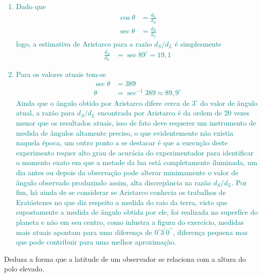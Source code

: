 \begin{sol}
	\textcolor{teal} {
		\begin{enumerate}[label=\alph *)]
			\item Dado que
			\begin{align}
				\cos \theta&=\frac{d_L}{d_S} \nonumber \\
				\sec \theta&=\frac{d_S}{d_L}
			\end{align}
			logo, a estimativa de Aristarco para a razão $d_S/d_L$ é simplesmente
			\begin{align}
				\frac{d_S}{d_L}&=\sec 89^{\circ}=19,1
			\end{align}
			\item Para os valores atuais tem-se
			\begin{align}
				\sec \theta&=389 \nonumber \\
				\theta&=\sec^{-1}389\approx 89,9^{\circ}				
			\end{align}
			Ainda que o ângulo obtido por Aristarco difere cerca de $3^{\circ}$ do valor de ângulo atual, a razão para $d_S/d_L$ encontrada por Aristarco é da ordem de 20 vezes menor que os resultados atuais, isso de fato deve requerer um instrumento de medida de ângulos altamente preciso, o que evidentemente não existia naquela época, um outro ponto a se destacar é que a execução deste experimento requer alto grau de acurácia do experimentador para identificar o momento exato em que a metade da lua está completamente iluminada, um dia antes ou depois da observação pode alterar minimamente o valor de ângulo observado produzindo assim, alta discrepância na razão $d_S/d_L$. Por fim, há ainda de se considerar se Aristarco conhecia os trabalhos de Eratóstenes no que diz respeito a medida do raio da terra, visto que supostamente a medida de ângulo obtida por ele, foi realizada na superfíce do planeta e não em seu centro, como inlustra a figura do exercício, medidas mais atuais \cite{BERTUOLA2016} apontam para uma diferença de $0^{\circ}3^{\prime }0^{\prime \prime}$, diferença pequena mas que pode contribuir para uma melhor aproximação.
		\end{enumerate}
	}
\end{sol}
\begin{prob}
	Deduza a forma que a latitude de um observador se relaciona com a altura do polo elevado.
\end{prob}
